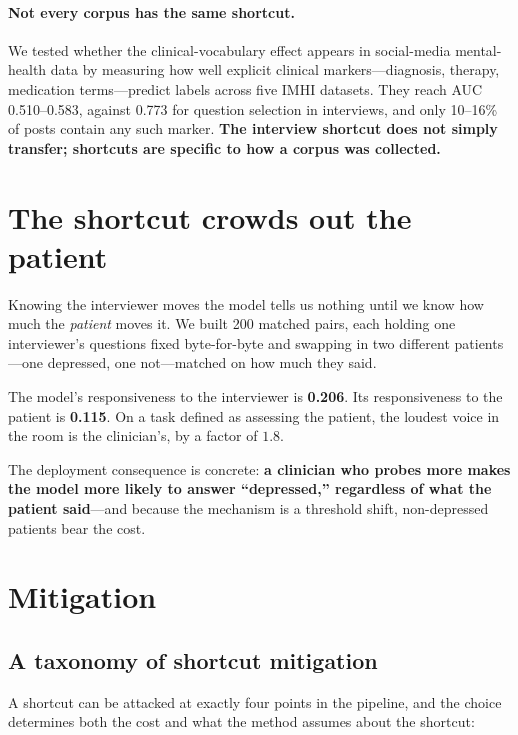 \documentclass{article}
\begin{document}
\paragraph{Not every corpus has the same shortcut.} We tested whether the
clinical-vocabulary effect appears in social-media mental-health data by
measuring how well explicit clinical markers---diagnosis, therapy, medication
terms---predict labels across five IMHI datasets. They reach AUC 0.510--0.583,
against 0.773 for question selection in interviews, and only 10--16\% of posts
contain any such marker. \textbf{The interview shortcut does not simply transfer;
shortcuts are specific to how a corpus was collected.}

\section{The shortcut crowds out the patient}
\label{sec:cost}

Knowing the interviewer moves the model tells us nothing until we know how much
the \emph{patient} moves it. We built 200 matched pairs, each holding one
interviewer's questions fixed byte-for-byte and swapping in two different
patients---one depressed, one not---matched on how much they said.

The model's responsiveness to the interviewer is \textbf{0.206}. Its
responsiveness to the patient is \textbf{0.115}. On a task defined as assessing
the patient, the loudest voice in the room is the clinician's, by a factor of
$1.8$.

The deployment consequence is concrete: \textbf{a clinician who probes more makes
the model more likely to answer ``depressed,'' regardless of what the patient
said}---and because the mechanism is a threshold shift, non-depressed patients
bear the cost.

\section{Mitigation}
\label{sec:mitigate}

\subsection{A taxonomy of shortcut mitigation}

A shortcut can be attacked at exactly four points in the pipeline, and the
choice determines both the cost and what the method assumes about the shortcut:
\end{document}
